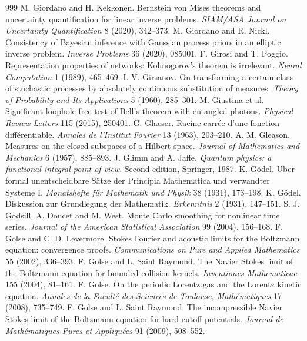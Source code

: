 \begin{thebibliography}{999}
 M. Giordano and H. Kekkonen. Bernstein von Mises theorems and uncertainty quantification for linear inverse problems. \emph{SIAM/ASA Journal on Uncertainty Quantification} 8 (2020), 342--373.
 M. Giordano and R. Nickl. Consistency of Bayesian inference with Gaussian process priors in an elliptic inverse problem. \emph{Inverse Problems} 36 (2020), 085001.
 F. Girosi and T. Poggio. Representation properties of networks: Kolmogorov's theorem is irrelevant. \emph{Neural Computation} 1 (1989), 465--469.
 I. V. Girsanov. On transforming a certain class of stochastic processes by absolutely continuous substitution of measures. \emph{Theory of Probability and Its Applications} 5 (1960), 285--301.
 M. Giustina et al. Significant loophole free test of Bell's theorem with entangled photons. \emph{Physical Review Letters} 115 (2015), 250401.
 G. Glaeser. Racine carr\'ee d'une fonction diff\'erentiable. \emph{Annales de l'Institut Fourier} 13 (1963), 203--210.
 A. M. Gleason. Measures on the closed subspaces of a Hilbert space. \emph{Journal of Mathematics and Mechanics} 6 (1957), 885--893.
 J. Glimm and A. Jaffe. \emph{Quantum physics: a functional integral point of view}. Second edition, Springer, 1987.
 K. G\"odel. \"Uber formal unentscheidbare S\"atze der Principia Mathematica und verwandter Systeme I. \emph{Monatshefte f\"ur Mathematik und Physik} 38 (1931), 173--198.
 K. G\"odel. Diskussion zur Grundlegung der Mathematik. \emph{Erkenntnis} 2 (1931), 147--151.
 S. J. Godsill, A. Doucet and M. West. Monte Carlo smoothing for nonlinear time series. \emph{Journal of the American Statistical Association} 99 (2004), 156--168.
 F. Golse and C. D. Levermore. Stokes Fourier and acoustic limits for the Boltzmann equation: convergence proofs. \emph{Communications on Pure and Applied Mathematics} 55 (2002), 336--393.
 F. Golse and L. Saint Raymond. The Navier Stokes limit of the Boltzmann equation for bounded collision kernels. \emph{Inventiones Mathematicae} 155 (2004), 81--161.
 F. Golse. On the periodic Lorentz gas and the Lorentz kinetic equation. \emph{Annales de la Facult\'e des Sciences de Toulouse, Math\'ematiques} 17 (2008), 735--749.
 F. Golse and L. Saint Raymond. The incompressible Navier Stokes limit of the Boltzmann equation for hard cutoff potentials. \emph{Journal de Math\'ematiques Pures et Appliqu\'ees} 91 (2009), 508--552.

\end{thebibliography}

